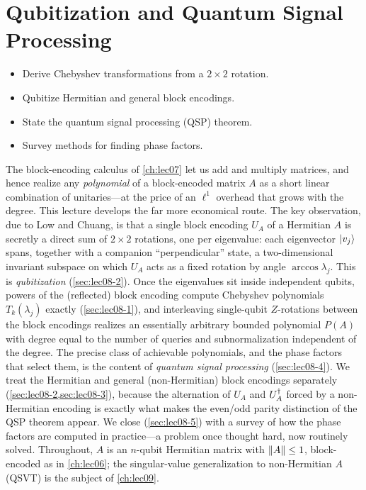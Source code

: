 \chapter{Qubitization and Quantum Signal Processing}
\label{ch:lec08}

\begin{objectives}
\begin{itemize}[leftmargin=1.4em,nosep]
  \item Derive Chebyshev transformations from a $2\times2$ rotation.
  \item Qubitize Hermitian and general block encodings.
  \item State the quantum signal processing (QSP) theorem.
  \item Survey methods for finding phase factors.
\end{itemize}
\end{objectives}

The block-encoding calculus of \cref{ch:lec07} let us add and multiply matrices,
and hence realize any \emph{polynomial} of a block-encoded matrix $A$ as a short
linear combination of unitaries---at the price of an $\ell^1$ overhead that grows
with the degree. This lecture develops the far more economical route. The key
observation, due to Low and Chuang, is that a single block encoding $U_A$ of a
Hermitian $A$ is secretly a direct sum of $2\times2$ rotations, one per eigenvalue:
each eigenvector $\ket{v_j}$ spans, together with a companion ``perpendicular''
state, a two-dimensional invariant subspace on which $U_A$ acts as a fixed
rotation by angle $\arccos\lambda_j$. This is \emph{qubitization}
(\cref{sec:lec08-2}). Once the eigenvalues sit inside independent qubits, powers of
the (reflected) block encoding compute Chebyshev polynomials
$T_k(\lambda_j)$ exactly (\cref{sec:lec08-1}), and interleaving single-qubit
$Z$-rotations between the block encodings realizes an essentially arbitrary bounded
polynomial $P(A)$ with degree equal to the number of queries and subnormalization
independent of the degree. The precise class of achievable polynomials, and the
phase factors that select them, is the content of \emph{quantum signal processing}
(\cref{sec:lec08-4}). We treat the Hermitian and general (non-Hermitian) block
encodings separately (\cref{sec:lec08-2,sec:lec08-3}), because the alternation of
$U_A$ and $U_A^{\dagger}$ forced by a non-Hermitian encoding is exactly what makes the
even/odd parity distinction of the QSP theorem appear. We close
(\cref{sec:lec08-5}) with a survey of how the phase factors are computed in
practice---a problem once thought hard, now routinely solved. Throughout, $A$ is an
$n$-qubit Hermitian matrix with $\left\lVert A \right\rVert\le1$, block-encoded as in
\cref{ch:lec06}; the singular-value generalization to non-Hermitian $A$ (QSVT) is
the subject of \cref{ch:lec09}.

